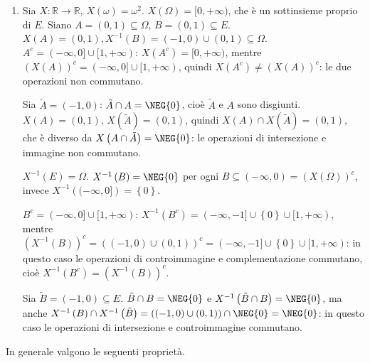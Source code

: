\documentclass{article}
\begin{document}
\begin{enumerate}
\item Sia $X:%
\mathbb{R}
\rightarrow 
\mathbb{R}
$, $X\left( \omega \right) =\omega ^{2}$. $X\left( \Omega \right)
=[0,+\infty )$, che \`{e} un sottinsieme proprio di $E$. Siano $A=\left(
0,1\right) \subseteq \Omega $, $B=\left( 0,1\right) \subseteq E$. $X\left(
A\right) =\left( 0,1\right) ,X^{-1}\left( B\right) =\left( -1,0\right) \cup
\left( 0,1\right) \subseteq \Omega $. $A^{c}=(-\infty ,0]\cup \lbrack
1,+\infty )$: $X\left( A^{c}\right) =[0,+\infty )$, mentre $\left( X\left(
A\right) \right) ^{c}=(-\infty ,0]\cup \lbrack 1,+\infty )$, quindi $X\left(
A^{c}\right) \neq \left( X\left( A\right) \right) ^{c}$: le due operazioni
non commutano.

Sia $\tilde{A}=\left( -1,0\right) $: $\tilde{A}\cap A=\NEG{0}$, cio\`{e} $%
\tilde{A}$ e $A$ sono disgiunti. $X\left( A\right) =\left( 0,1\right) $, $%
X\left( \tilde{A}\right) =\left( 0,1\right) $, quindi $X\left( A\right) \cap
X\left( \tilde{A}\right) =\left( 0,1\right) $, che \`{e} diverso da $X\left(
A\cap \tilde{A}\right) =\NEG{0}$: le operazioni di intersezione e immagine
non commutano.

$X^{-1}\left( E\right) =\Omega $. $X^{-1}\left( B\right) =\NEG{0}$ per ogni $%
B\subseteq \left( -\infty ,0\right) =\left( X\left( \Omega \right) \right)
^{c}$, invece $X^{-1}\left( (-\infty ,0]\right) =\left\{ 0\right\} $.

$B^{c}=(-\infty ,0]\cup \lbrack 1,+\infty )$: $X^{-1}\left( B^{c}\right)
=(-\infty ,-1]\cup \left\{ 0\right\} \cup \lbrack 1,+\infty )$, mentre $%
\left( X^{-1}\left( B\right) \right) ^{c}=\left( \left( -1,0\right) \cup
\left( 0,1\right) \right) ^{c}=(-\infty ,-1]\cup \left\{ 0\right\} \cup
\lbrack 1,+\infty )$: in questo caso le operazioni di controimmagine e
complementazione commutano, cio\`{e} $X^{-1}\left( B^{c}\right) =\left(
X^{-1}\left( B\right) \right) ^{c}$.

Sia $\tilde{B}=\left( -1,0\right) \subseteq E$. $\tilde{B}\cap B=\NEG{0}$ e $%
X^{-1}\left( \tilde{B}\cap B\right) =\NEG{0}$, ma anche $X^{-1}\left(
B\right) \cap X^{-1}\left( \tilde{B}\right) =\left( \left( -1,0\right) \cup
\left( 0,1\right) \right) \cap \NEG{0}=\NEG{0}$: in questo caso le
operazioni di intersezione e controimmagine commutano.
\end{enumerate}

In generale valgono le seguenti propriet\`{a}.
\end{document}
